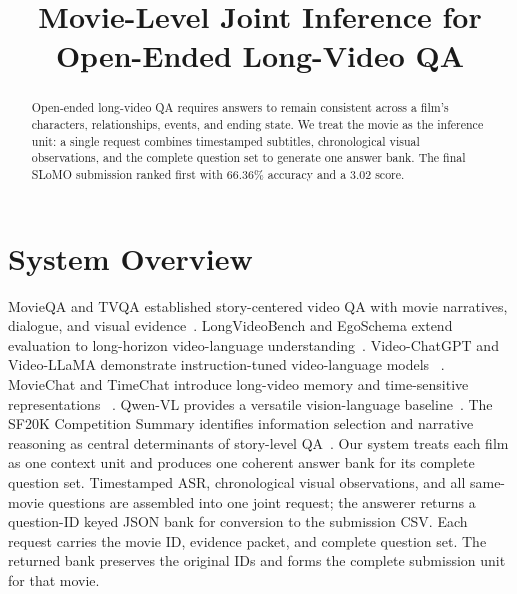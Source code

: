 \documentclass[runningheads]{llncs}
\begin{document}
\title{Movie-Level Joint Inference for Open-Ended Long-Video QA}
\author{}
\authorrunning{}
\institute{}
\maketitle
\pagestyle{empty}

\begin{abstract}
Open-ended long-video QA requires answers to remain consistent across a film's
characters, relationships, events, and ending state. We treat the movie as the
inference unit: a single request combines timestamped subtitles, chronological
visual observations, and the complete question set to generate one answer bank.
The final SLoMO submission ranked first with 66.36\% accuracy and a 3.02 score.
\end{abstract}

\section{System Overview}

MovieQA and TVQA established story-centered video QA with movie narratives,
dialogue, and visual evidence~\cite{tapaswi2016movieqa,lei2018tvqa}.
LongVideoBench and EgoSchema extend evaluation to long-horizon video-language
understanding~\cite{wu2024longvideobench,mangalam2023egoschema}. Video-ChatGPT
and Video-LLaMA demonstrate instruction-tuned video-language models
~\cite{maaz2024videochatgpt,zhang2023videollama}. MovieChat and TimeChat
introduce long-video memory and time-sensitive representations
~\cite{song2024moviechat,ren2024timechat}. Qwen-VL provides a versatile
vision-language baseline~\cite{bai2023qwenvl}.
The SF20K Competition Summary identifies information selection and narrative
reasoning as central determinants of story-level QA~\cite{ghermi2026sf20k}.
Our system treats each film as one context unit and produces one coherent
answer bank for its complete question set. Timestamped ASR, chronological
visual observations, and all same-movie questions are assembled into one joint
request; the answerer returns a question-ID keyed JSON bank for conversion to
the submission CSV. Each request carries the movie ID, evidence packet, and
complete question set. The returned bank preserves the original IDs and forms
the complete submission unit for that movie.
\end{document}

